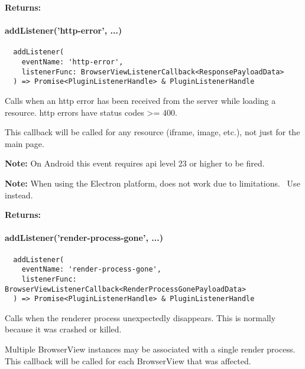 \textbf{Returns:} 


\newpage

\paragraph{addListener('http-error', ...)}

\begin{verbatim}
  addListener(
    eventName: 'http-error',
    listenerFunc: BrowserViewListenerCallback<ResponsePayloadData>
  ) => Promise<PluginListenerHandle> & PluginListenerHandle
\end{verbatim}

Calls  when an \ac{http} error has been received from the server while loading a resource.
\ac{http} errors have status codes >= 400.

This callback will be called for any resource (iframe, image, etc.), not just for the main page.

\textbf{Note:} On Android this event requires \ac{api} level 23 or higher to be fired.~\cite{android:api}

\textbf{Note:} When using the Electron platform,  does not work due to limitations.~\cite{capacitor-electron}
Use  instead.

\textbf{Returns:} 



\paragraph{addListener('render-process-gone', ...)}

\begin{verbatim}
  addListener(
    eventName: 'render-process-gone',
    listenerFunc: BrowserViewListenerCallback<RenderProcessGonePayloadData>
  ) => Promise<PluginListenerHandle> & PluginListenerHandle
\end{verbatim}

Calls  when the renderer process unexpectedly disappears.
This is normally because it was crashed or killed.

Multiple BrowserView instances may be associated with a single render process.
This callback will be called for each BrowserView that was affected.

